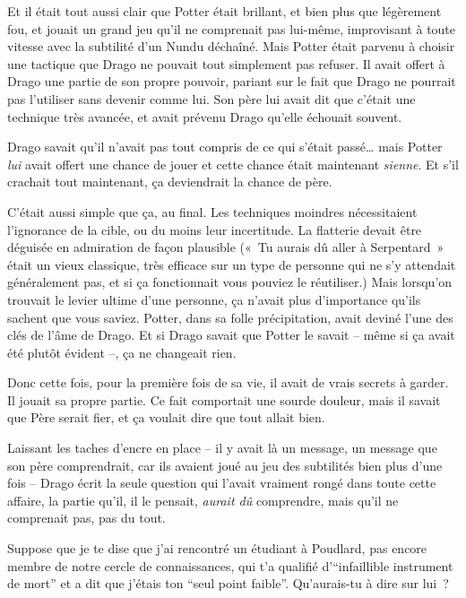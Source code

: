 Et il était tout aussi clair que Potter était brillant, et bien plus que légèrement fou, et jouait un grand jeu qu'il ne comprenait pas lui-même, improvisant à toute vitesse avec la subtilité d'un Nundu déchaîné. Mais Potter était parvenu à choisir une tactique que Drago ne pouvait tout simplement pas refuser. Il avait offert à Drago une partie de son propre pouvoir, pariant sur le fait que Drago ne pourrait pas l'utiliser sans devenir comme lui. Son père lui avait dit que c'était une technique très avancée, et avait prévenu Drago qu'elle échouait souvent.

Drago savait qu'il n'avait pas tout compris de ce qui s'était passé… mais Potter \emph{lui} avait offert une chance de jouer et cette chance était maintenant \emph{sienne}. Et s'il crachait tout maintenant, ça deviendrait la chance de père.

C'était aussi simple que ça, au final. Les techniques moindres nécessitaient l'ignorance de la cible, ou du moins leur incertitude. La flatterie devait être déguisée en admiration de façon plausible («~Tu aurais dû aller à Serpentard~» était un vieux classique, très efficace sur un type de personne qui ne s'y attendait généralement pas, et si ça fonctionnait vous pouviez le réutiliser.) Mais lorsqu'on trouvait le levier ultime d'une personne, ça n'avait plus d'importance qu'ils sachent que vous saviez. Potter, dans sa folle précipitation, avait deviné l'une des clés de l'âme de Drago. Et si Drago savait que Potter le savait -- même si ça avait été plutôt évident --, ça ne changeait rien.

Donc cette fois, pour la première fois de sa vie, il avait de vrais secrets à garder. Il jouait sa propre partie. Ce fait comportait une sourde douleur, mais il savait que Père serait fier, et ça voulait dire que tout allait bien.

Laissant les taches d'encre en place -- il y avait là un message, un message que son père comprendrait, car ils avaient joué au jeu des subtilités bien plus d'une fois -- Drago écrit la seule question qui l'avait vraiment rongé dans toute cette affaire, la partie qu'il, il le pensait, \emph{aurait dû} comprendre, mais qu'il ne comprenait pas, pas du tout.

\begin{writtenNote}

Suppose que je te dise que j'ai rencontré un étudiant à Poudlard, pas encore membre de notre cercle de connaissances, qui t'a qualifié d’“infaillible instrument de mort” et a dit que j'étais ton “seul point faible”. Qu'aurais-tu à dire sur lui~?

\end{writtenNote}


